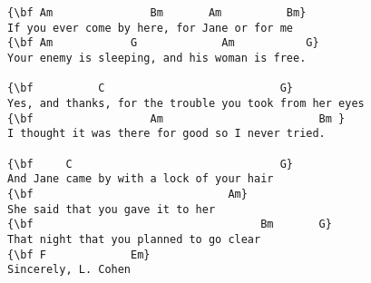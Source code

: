 \documentclass[a4paper]{article}
\begin{document}
\begin{Verbatim}[commandchars=\\\{\}]
{\bf Am               Bm       Am          Bm}
If you ever come by here, for Jane or for me
{\bf Am            G             Am           G}
Your enemy is sleeping, and his woman is free.

{\bf          C                           G}
Yes, and thanks, for the trouble you took from her eyes
{\bf                  Am                        Bm }
I thought it was there for good so I never tried.

{\bf     C                                G}
And Jane came by with a lock of your hair
{\bf                              Am}
She said that you gave it to her
{\bf                                   Bm       G}
That night that you planned to go clear
{\bf F             Em}
Sincerely, L. Cohen
\end{Verbatim}
\newpage
\end{document}
